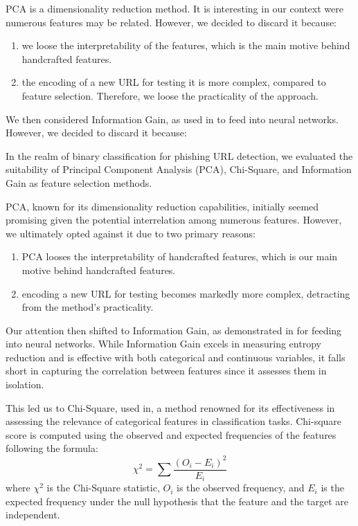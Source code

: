 \documentclass{article}
\begin{document}
    PCA is a dimensionality reduction method.
    It is interesting in our context were numerous features may be related.
    However, we decided to discard it because:
    \begin{enumerate}
        \item we loose the interpretability of the features, which is the main motive behind handcrafted features.
        \item the encoding of a new URL for testing it is more complex, compared to feature selection.
        Therefore, we loose the practicality of the approach.
    \end{enumerate}

    We then considered Information Gain, as used in\cite{EfficientDeepLearningPhishingDetection} to feed into neural networks.
    However, we decided to discard it because:

    In the realm of binary classification for phishing URL detection, we evaluated the suitability of Principal Component Analysis (PCA), Chi-Square, and Information Gain as feature selection methods.

    PCA, known for its dimensionality reduction capabilities, initially seemed promising given the potential interrelation among numerous features.
    However, we ultimately opted against it due to two primary reasons:
    \begin{enumerate}
        \item PCA looses the interpretability of handcrafted features, which is our main motive behind handcrafted features.
        \item encoding a new URL for testing becomes markedly more complex, detracting from the method's practicality.
    \end{enumerate}

    Our attention then shifted to Information Gain, as demonstrated in\cite{EfficientDeepLearningPhishingDetection} for feeding into neural networks.
    While Information Gain excels in measuring entropy reduction and is effective with both categorical and continuous variables, it falls short in capturing the correlation between features since it assesses them in isolation.

    This led us to Chi-Square, used in\cite{LexicalFeatureSelection}, a method renowned for its effectiveness in assessing the relevance of categorical features in classification tasks.
    Chi-square score is computed using the observed and expected frequencies of the features following the formula:
    \begin{equation}
        \chi^2 = \sum \frac{(O_i - E_i)^2}{E_i}
    \end{equation}
    where \( \chi^2 \) is the Chi-Square statistic, \( O_i \) is the observed frequency, and \( E_i \) is the expected frequency under the null hypothesis that the feature and the target are independent.
\end{document}
